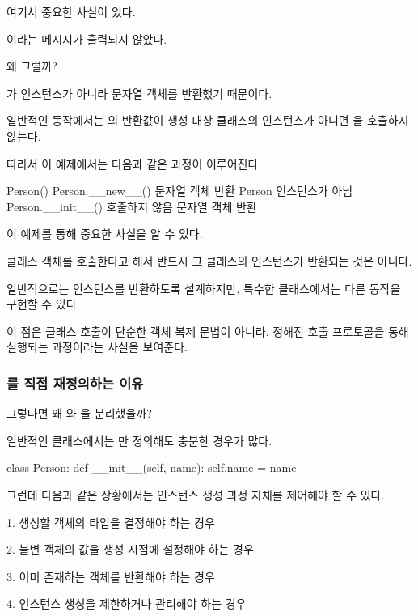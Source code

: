 여기서 중요한 사실이 있다.

 이라는 메시지가 출력되지 않았다.

왜 그럴까?

가  인스턴스가 아니라 문자열 객체를 반환했기 때문이다.

일반적인  동작에서는 의 반환값이 생성 대상 클래스의 인스턴스가 아니면 을 호출하지 않는다.

따라서 이 예제에서는 다음과 같은 과정이 이루어진다.

\begin{dhksmry}[centered]
Person()
\da
Person.__new__()
\da
문자열 객체 반환
\da
Person 인스턴스가 아님
\da
Person.__init__() 호출하지 않음
\da
문자열 객체 반환
\end{dhksmry}

이 예제를 통해 중요한 사실을 알 수 있다.

클래스 객체를 호출한다고 해서 반드시 그 클래스의 인스턴스가 반환되는 것은 아니다.

일반적으로는 인스턴스를 반환하도록 설계하지만, 특수한 클래스에서는 다른 동작을 구현할 수 있다.

이 점은 클래스 호출이 단순한 객체 복제 문법이 아니라, 정해진 호출 프로토콜을 통해 실행되는 과정이라는 사실을 보여준다.

\subsubsection{를 직접 재정의하는 이유}

그렇다면 왜 와 을 분리했을까?

일반적인 클래스에서는 만 정의해도 충분한 경우가 많다.

\begin{dhkcode}
class Person:
    def __init__(self, name):
        self.name = name
\end{dhkcode}

그런데 다음과 같은 상황에서는 인스턴스 생성 과정 자체를 제어해야 할 수 있다.

\begin{dhksmry}
    1. 생성할 객체의 타입을 결정해야 하는 경우

    2. 불변 객체의 값을 생성 시점에 설정해야 하는 경우

    3. 이미 존재하는 객체를 반환해야 하는 경우

    4. 인스턴스 생성을 제한하거나 관리해야 하는 경우
\end{dhksmry}

